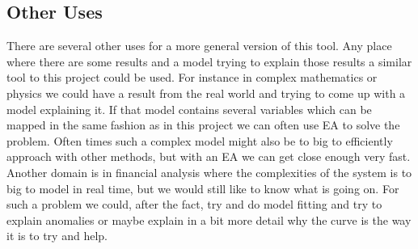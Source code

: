 \subsection{Other Uses}\label{sec:other-uses}
There are several other uses for a more general version of this tool. Any place
where there are some results and a model trying to explain those results a
similar tool to this project could be used. For instance in complex mathematics
or physics we could have a result from the real world and trying to come up with
a model explaining it. If that model contains several variables which can be
mapped in the same fashion as in this project we can often use EA to solve the
problem. Often times such a complex model
might also be to big to efficiently approach with other methods, but with an EA
we can get close enough very fast. Another domain is in financial analysis where
the complexities of the system is to big to model in real time, but we would
still like to know what is going on. For such a problem we could, after the
fact, try and do model fitting and try to explain anomalies or maybe explain in
a bit more detail why the curve is the way it is to try and help.
